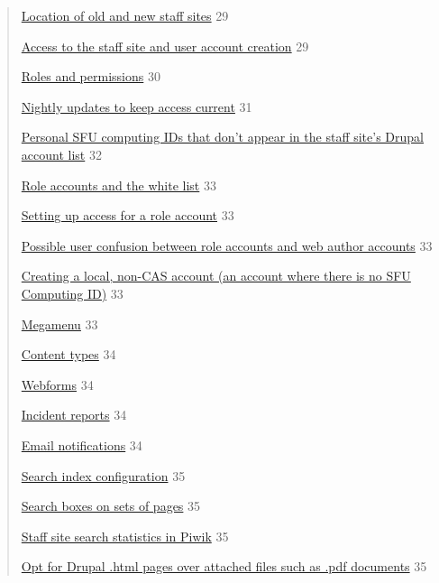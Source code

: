 \documentclass[
  openany]{book}
\begin{document}
\begin{quote}
\protect\hyperlink{location-of-old-and-new-staff-sites}{Location of old and new staff
sites} 29

\protect\hyperlink{access-to-the-staff-site-and-user-account-creation}{Access to the staff site and user account
creation} 29

\protect\hyperlink{roles-and-permissions}{Roles and permissions} 30

\protect\hyperlink{nightly-updates-to-keep-access-current}{Nightly updates to keep access
current} 31

\protect\hyperlink{personal-sfu-computing-ids-that-dont-appear-in-the-staff-sites-drupal-account-list}{Personal SFU computing IDs that don't appear in the staff site's
Drupal account
list}
32

\protect\hyperlink{role-accounts-and-the-white-list}{Role accounts and the white list}
33

\protect\hyperlink{setting-up-access-for-a-role-account}{Setting up access for a role
account} 33

\protect\hyperlink{possible-user-confusion-between-role-accounts-and-web-author-accounts}{Possible user confusion between role accounts and web author
accounts}
33

\protect\hyperlink{creating-a-local-non-cas-account-an-account-where-there-is-no-sfu-computing-id}{Creating a local, non-CAS account (an account where there is no SFU
Computing
ID)}
33

\protect\hyperlink{megamenu}{Megamenu} 33

\protect\hyperlink{content-types}{Content types} 34

\protect\hyperlink{webforms}{Webforms} 34

\protect\hyperlink{incident-reports}{Incident reports} 34

\protect\hyperlink{email-notifications}{Email notifications} 34

\protect\hyperlink{search-index-configuration}{Search index configuration} 35

\protect\hyperlink{search-boxes-on-sets-of-pages}{Search boxes on sets of pages} 35

\protect\hyperlink{staff-site-search-statistics-in-piwik}{Staff site search statistics in
Piwik} 35

\protect\hyperlink{opt-for-drupal-.html-pages-over-attached-files-such-as-.pdf-documents}{Opt for Drupal .html pages over attached files such as .pdf
documents}
35
\end{quote}
\end{document}
